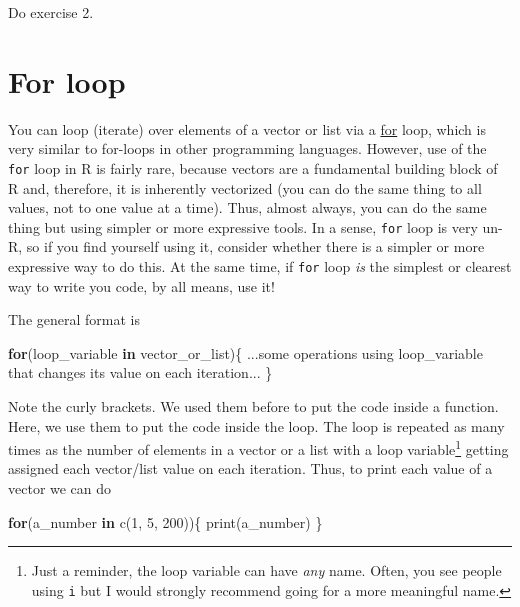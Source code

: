 \documentclass[
]{book}
\newenvironment{Shaded}{\begin{snugshade}}{\end{snugshade}}
\newcommand{\ControlFlowTok}[1]{\textcolor[rgb]{0.13,0.29,0.53}{\textbf{#1}}}
\newcommand{\DecValTok}[1]{\textcolor[rgb]{0.00,0.00,0.81}{#1}}
\newcommand{\FunctionTok}[1]{\textcolor[rgb]{0.00,0.00,0.00}{#1}}
\newcommand{\NormalTok}[1]{#1}
\begin{document}
Do exercise 2.

\hypertarget{forloop}{%
\section{For loop}\label{forloop}}

You can loop (iterate) over elements of a vector or list via a \href{https://stat.ethz.ch/R-manual/R-devel/library/base/html/Control.html}{for} loop, which is very similar to for-loops in other programming languages. However, use of the \texttt{for} loop in R is fairly rare, because vectors are a fundamental building block of R and, therefore, it is inherently vectorized (you can do the same thing to all values, not to one value at a time). Thus, almost always, you can do the same thing but using simpler or more expressive tools. In a sense, \texttt{for} loop is very un-R, so if you find yourself using it, consider whether there is a simpler or more expressive way to do this. At the same time, if \texttt{for} loop \emph{is} the simplest or clearest way to write you code, by all means, use it!

The general format is

\begin{Shaded}
\begin{Highlighting}[]
\ControlFlowTok{for}\NormalTok{(loop\_variable }\ControlFlowTok{in}\NormalTok{ vector\_or\_list)\{}
\NormalTok{  ...some operations using loop\_variable that}
\NormalTok{  changes its value on each iteration... }
\NormalTok{\}}
\end{Highlighting}
\end{Shaded}

Note the curly brackets. We used them before to put the code inside a function. Here, we use them to put the code inside the loop. The loop is repeated as many times as the number of elements in a vector or a list with a loop variable\footnote{Just a reminder, the loop variable can have \emph{any} name. Often, you see people using \texttt{i} but I would strongly recommend going for a more meaningful name.} getting assigned each vector/list value on each iteration. Thus, to print each value of a vector we can do

\begin{Shaded}
\begin{Highlighting}[]
\ControlFlowTok{for}\NormalTok{(a\_number }\ControlFlowTok{in} \FunctionTok{c}\NormalTok{(}\DecValTok{1}\NormalTok{, }\DecValTok{5}\NormalTok{, }\DecValTok{200}\NormalTok{))\{}
  \FunctionTok{print}\NormalTok{(a\_number)}
\NormalTok{\}}
\end{Highlighting}
\end{Shaded}
\end{document}
